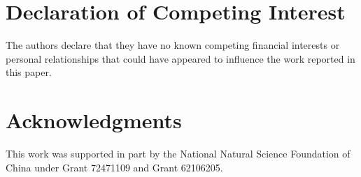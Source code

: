 \documentclass[a4paper]{cas-sc}
\begin{document}
\printcredits


\section*{Declaration of Competing Interest}
The authors declare that they have no known competing financial interests or personal relationships that could have appeared to influence the work reported in this paper.


\section*{Acknowledgments}
This work was supported in part by the National Natural Science Foundation of China under Grant 72471109 and Grant 62106205.




%
% 

% 
 

\end{document}
